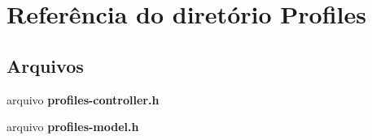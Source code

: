 \section{Referência do diretório Profiles}
\label{dir_3d816f7e88840a3f51d08938e87cb1fb}
\subsection*{Arquivos}
\begin{DoxyCompactItemize}
\item 
arquivo {\bf profiles-\/controller.\+h}
\item 
arquivo {\bf profiles-\/model.\+h}
\end{DoxyCompactItemize}
